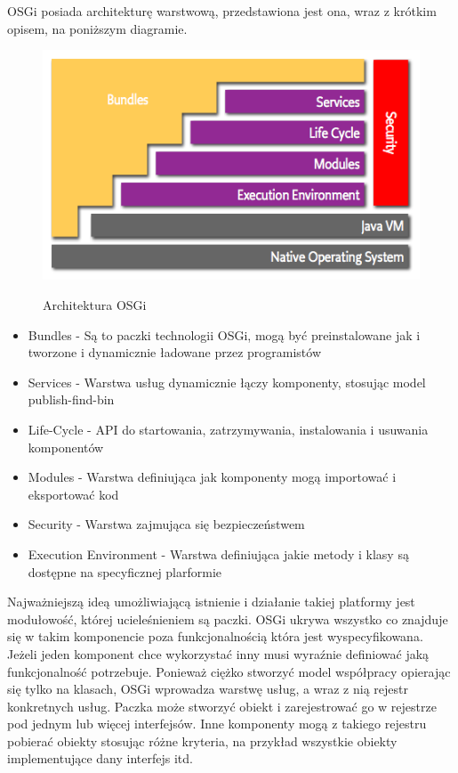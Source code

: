 OSGi posiada architekturę warstwową, przedstawiona jest ona, wraz z krótkim opisem, na poniższym diagramie.
\newpage
\begin{figure}[!h]
	\centering
	\includegraphics[scale=0.65]{osgiArchitektura.png} 
	\cite{fusehomepage2012}
	\caption{Architektura OSGi}
\end{figure}
\begin{itemize}
	\item Bundles - Są to paczki technologii OSGi, mogą być preinstalowane jak i tworzone i dynamicznie ładowane przez programistów
	\item Services - Warstwa usług dynamicznie łączy komponenty, stosując model publish-find-bin
	\item Life-Cycle - API do startowania, zatrzymywania, instalowania i usuwania komponentów
	\item Modules - Warstwa definiująca jak komponenty mogą importować i eksportować kod	
	\item Security - Warstwa zajmująca się bezpieczeństwem
	\item Execution Environment - Warstwa definiująca jakie metody i klasy są dostępne na specyficznej plarformie
\end{itemize}  
Najważniejszą ideą umożliwiającą istnienie i działanie takiej platformy jest modułowość, której ucieleśnieniem są paczki. OSGi ukrywa wszystko co znajduje się w takim komponencie poza funkcjonalnością która jest wyspecyfikowana. Jeżeli jeden komponent chce wykorzystać inny musi wyraźnie definiować jaką funkcjonalność potrzebuje. Ponieważ ciężko stworzyć model współpracy opierając się tylko na klasach, OSGi wprowadza warstwę usług, a wraz z nią rejestr konkretnych usług. Paczka może stworzyć obiekt i zarejestrować go w rejestrze pod jednym lub więcej interfejsów. Inne komponenty mogą z takiego rejestru pobierać obiekty stosując różne kryteria, na przykład wszystkie obiekty implementujące dany interfejs itd.
